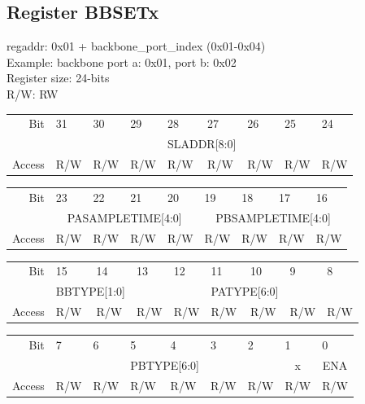 \subsection{Register BBSETx}
regaddr: 0x01 + backbone\_port\_index (0x01-0x04)\\
Example: backbone port a: 0x01, port b: 0x02\\
Register size: 24-bits\\
R/W: RW\\
\begin{table}[h!]
    \centering
\begin{tabular}{rp{1cm}p{1cm}p{1cm}p{1cm}p{1cm}p{1cm}p{1cm}p{1cm}}
Bit &
  31 &
  30 &
  29 &
  28 &
  27 &
  26 &
  25 &
  24 \\ \cline{2-9} 
\multicolumn{1}{r|}{} &
  \multicolumn{2}{c}{} &
   \multicolumn{1}{c}{} &
  \multicolumn{2}{l}{\scriptsize{SLADDR[8:0]}} &
  \multicolumn{1}{c}{} &
  \multicolumn{1}{c}{} &
  \multicolumn{1}{c|}{} \\\cline{2-9} 
Access &
  R/W &
  R/W &
  R/W &
  R/W &
  R/W &
  R/W &
  R/W &
  R/W
\end{tabular}
\begin{tabular}{rp{1cm}p{1cm}p{1cm}p{1cm}p{1cm}p{1cm}p{1cm}p{1cm}}
Bit &
  23 &
  22 &
  21 &
  20 &
  19 &
  18 &
  17 &
  16 \\ \cline{2-9} 
\multicolumn{1}{r|}{} &
\multicolumn{4}{c|}{\scriptsize{PASAMPLETIME[4:0]}} & 
\multicolumn{4}{c|}{\scriptsize{PBSAMPLETIME[4:0]}} \\\cline{2-9} 
Access &
  R/W &
  R/W &
  R/W &
  R/W &
  R/W &
  R/W &
  R/W &
  R/W
\end{tabular}
\begin{tabular}{rp{1cm}p{1cm}p{1cm}p{1cm}p{1cm}p{1cm}p{1cm}p{1cm}}
Bit &
  15 &
  14 &
  13 &
  12 &
  11 &
  10 &
  9 &
  8 \\ \cline{2-9} 
  
\multicolumn{1}{r|}{} &
  \multicolumn{2}{c|}{{\scriptsize{BBTYPE[1:0]}}} &
  \multicolumn{2}{c}{} &
  \multicolumn{2}{c}{{\scriptsize{PATYPE[6:0]}}} &
  \multicolumn{1}{c}{} &
  \multicolumn{1}{c|}{} \\\cline{2-9} 
Access &
  R/W &
  R/W &
  R/W &
  R/W &
  R/W &
  R/W &
  R/W &
  R/W
\end{tabular}
\begin{tabular}{rp{1cm}p{1cm}p{1cm}p{1cm}p{1cm}p{1cm}p{1cm}p{1cm}}
Bit &
  7 &
  6 &
  5 &
  4 &
  3 &
  2 &
  1 &
  0 \\ \cline{2-9} 

  \multicolumn{1}{r|}{} &
  \multicolumn{2}{c}{} &
  \multicolumn{2}{c}{\scriptsize{PBTYPE[6:0]}} &
  \multicolumn{2}{c|}{} &
  \multicolumn{1}{c|}{x} &
  \multicolumn{1}{c|}{\scriptsize{ENA}} \\\cline{2-9} 
  
Access &
  R/W &
  R/W &
  R/W &
  R/W &
  R/W &
  R/W &
  R/W &
  R/W
\end{tabular}
\end{table}\\
